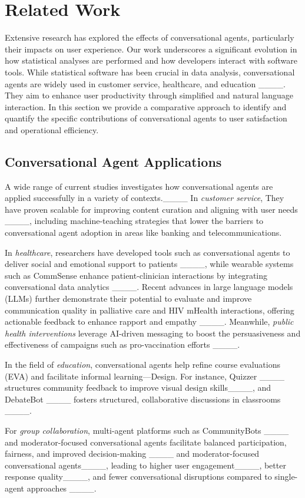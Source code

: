 \section{Related Work}
Extensive research has explored the effects of conversational agents, particularly their impacts on user experience. Our work underscores a significant evolution in how statistical analyses are performed and how developers interact with software tools. While statistical software has been crucial in data analysis, conversational agents are widely used in customer service, healthcare, and education ____. They aim to enhance user productivity through simplified and natural language interaction. In this section we provide a comparative approach to identify and quantify the specific contributions of conversational agents to user satisfaction and operational efficiency.
\subsection{Conversational Agent Applications}
A wide range of current studies investigates how conversational agents are applied successfully in a variety of contexts.____ In \textit{customer service}, They have proven scalable for improving content curation and aligning with user needs ____, including machine-teaching strategies that lower the barriers to conversational agent adoption in areas like banking and telecommunications. 

In \textit{healthcare}, researchers have developed tools such as conversational agents to deliver social and emotional support to patients ____, while wearable systems such as CommSense enhance patient-clinician interactions by integrating conversational data analytics ____. Recent advances in large language models (LLMs) further demonstrate their potential to evaluate and improve communication quality in palliative care and HIV mHealth interactions, offering actionable feedback to enhance rapport and empathy ____. Meanwhile, \textit{public health interventions} leverage AI-driven messaging to boost the persuasiveness and effectiveness of campaigns such as pro-vaccination efforts ____. 

In the field of \textit{education}, conversational agents help refine course evaluations (EVA) and facilitate informal learning—Design. For instance, Quizzer ____ structures community feedback to improve visual design skills____, and DebateBot ____ fosters structured, collaborative discussions in classrooms ____. 

For \textit{group collaboration}, multi-agent platforms such as CommunityBots ____ and moderator-focused conversational agents facilitate balanced participation, fairness, and improved decision-making ____ and moderator-focused conversational agents____, leading to higher user engagement____, better response quality____, and fewer conversational disruptions compared to single-agent approaches ____. 

